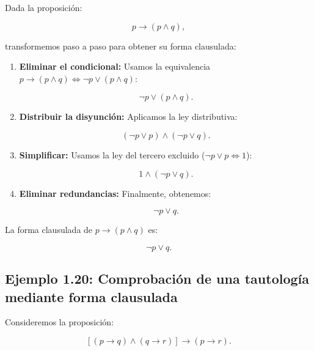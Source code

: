 Dada la proposición:

\[ p \to (p \land q), \]

transformemos paso a paso para obtener su forma clausulada:

\begin{enumerate}
    \item \textbf{Eliminar el condicional:} Usamos la equivalencia \(p \to
      (p \land q) \iff \neg p \lor (p \land q)\):

    \[ \neg p \lor (p \land q). \]

    \item \textbf{Distribuir la disyunción:} Aplicamos la ley distributiva:

    \[ (\neg p \lor p) \land (\neg p \lor q). \]

    \item \textbf{Simplificar:} Usamos la ley del tercero excluido (\(\neg p
    \lor p \iff 1\)):

    \[ 1 \land (\neg p \lor q). \]

    \item \textbf{Eliminar redundancias:} Finalmente, obtenemos:

    \[ \neg p \lor q. \]
\end{enumerate}

La forma clausulada de \(p \to (p \land q)\) es:

\[ \neg p \lor q. \]


\subsection{Ejemplo 1.20: Comprobación de una tautología mediante forma clausulada}

Consideremos la proposición:

\[ [(p \to q) \land (q \to r)] \to (p \to r). \]

